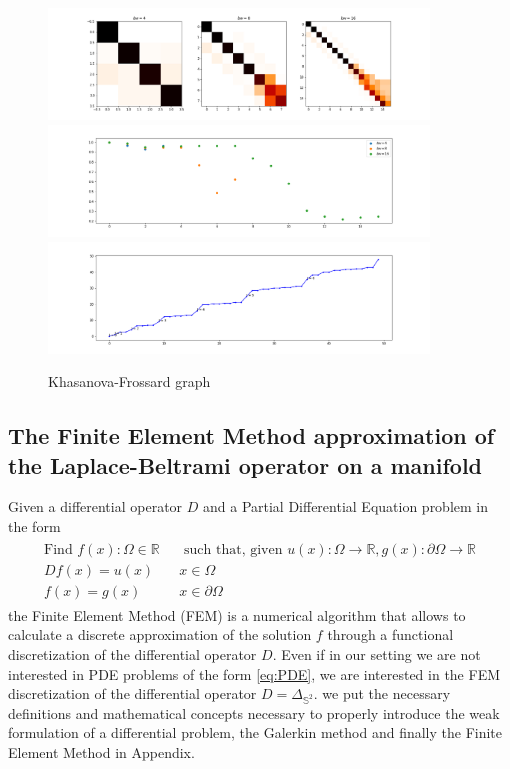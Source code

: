 \begin{figure}[h!]
	\centering
	\includegraphics[width=0.9\textwidth]{../codes/02.HeatKernelGraphLaplacian/equiangular/equi_Khasanova_Frossard_full.png}
	\includegraphics[width=0.9\textwidth]{../codes/02.HeatKernelGraphLaplacian/equiangular/equi_Khasanova_Frossard_full_diagonal.png}
	\includegraphics[width=0.9\textwidth]{../codes/02.HeatKernelGraphLaplacian/equiangular/equi_full_Khasanova_Frossard_eigenvalues_16.png}
	\caption{\label{fig:Frossard/Khasanova graph}Khasanova-Frossard graph}
\end{figure}

\subsection{The Finite Element Method approximation of the Laplace-Beltrami operator on a manifold}\label{sec:Chapter3: Using the Finite Element Method to approximate the Laplace-Beltrami operator on a manifold}
Given a differential operator $D$ and a Partial Differential Equation problem in the form
\begin{align}\label{eq:PDE}
\begin{split}
\text{Find } f(x):\Omega\in\mathbb R &\text{ such that, given }u(x):\Omega\to\mathbb R, g(x):\partial\Omega\to\mathbb R\\
Df(x)=u(x)\quad&x\in\Omega\\
f(x)=g(x)\quad &x\in\partial\Omega
\end{split}
\end{align}
the Finite Element Method (FEM) is a numerical algorithm that allows to calculate a discrete approximation of the solution $f$ through a functional discretization of the differential operator $D$. Even if in our setting we are not interested in PDE problems of the form \ref{eq:PDE}, we are interested in the FEM discretization of the differential operator $D=\Delta_{\mathbb S^2}$. we put the necessary definitions and mathematical concepts necessary to properly introduce the weak formulation of a differential problem, the Galerkin method and finally the Finite Element Method in Appendix.\\
